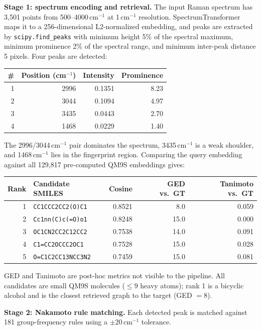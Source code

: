\documentclass[conference]{IEEEtran}
\begin{document}
\textbf{Stage 1: spectrum encoding and retrieval.} The input Raman spectrum has 3,501 points from 500--4000\,cm$^{-1}$ at 1\,cm$^{-1}$ resolution. SpectrumTransformer maps it to a 256-dimensional L2-normalized embedding, and peaks are extracted by \texttt{scipy.find\_peaks} with minimum height 5\% of the spectral maximum, minimum prominence 2\% of the spectral range, and minimum inter-peak distance 5 pixels. Four peaks are detected:

\begin{center}
\scriptsize
\begin{tabular}{rrrr}
\toprule
\# & Position (cm$^{-1}$) & Intensity & Prominence\\
\midrule
1 & 2996 & 0.1351 & 8.23\\
2 & 3044 & 0.1094 & 4.97\\
3 & 3435 & 0.0443 & 2.70\\
4 & 1468 & 0.0229 & 1.40\\
\bottomrule
\end{tabular}
\end{center}

The 2996/3044\,cm$^{-1}$ pair dominates the spectrum, 3435\,cm$^{-1}$ is a weak shoulder, and 1468\,cm$^{-1}$ lies in the fingerprint region. Comparing the query embedding against all 129,817 pre-computed QM9S embeddings gives:

\begin{center}
\tiny
\begin{tabular}{rlrrr}
\toprule
Rank & Candidate SMILES & Cosine & GED vs.\ GT & Tanimoto vs.\ GT\\
\midrule
1 & \texttt{CC1CCC2CC2(O)C1} & 0.8521 & 8.0 & 0.059\\
2 & \texttt{Cc1nn(C)c(=O)o1} & 0.8248 & 15.0 & 0.000\\
3 & \texttt{OC1CN2CC2C12CC2} & 0.7538 & 14.0 & 0.091\\
4 & \texttt{C1=CC2OCCC2OC1} & 0.7528 & 15.0 & 0.028\\
5 & \texttt{O=C1C2CC13NCC3N2} & 0.7459 & 15.0 & 0.081\\
\bottomrule
\end{tabular}
\end{center}

GED and Tanimoto are post-hoc metrics not visible to the pipeline. All candidates are small QM9S molecules ($\leq9$ heavy atoms); rank 1 is a bicyclic alcohol and is the closest retrieved graph to the target (GED $=8$).

\textbf{Stage 2: Nakamoto rule matching.} Each detected peak is matched against 181 group-frequency rules using a $\pm20$\,cm$^{-1}$ tolerance.
\end{document}
